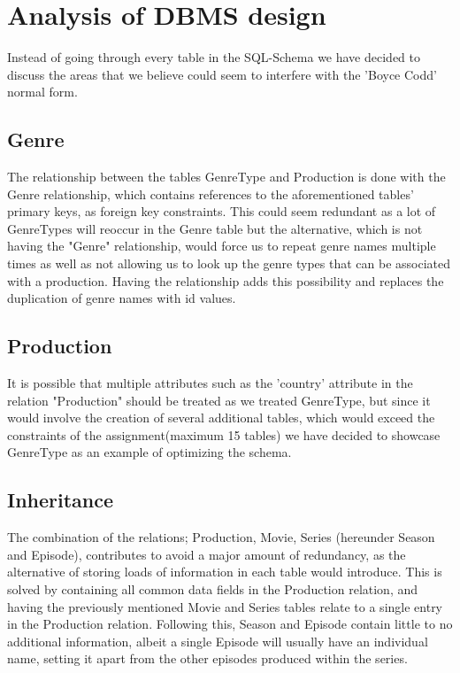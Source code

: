 \section{Analysis of DBMS design}

Instead of going through every table in the SQL-Schema we have decided to discuss the areas that we believe could seem to interfere with the 'Boyce Codd' normal form.\\ 

\subsection{Genre}
The relationship between the tables GenreType and Production is done with the Genre relationship, which contains references to the aforementioned tables' primary keys, as foreign key constraints. This could seem redundant as a lot of GenreTypes will reoccur in the Genre table but the alternative, which is not having the "Genre" relationship, would force us to repeat genre names multiple times as well as not allowing us to look up the genre types that can be associated with a production. Having the relationship adds this possibility and replaces the duplication of genre names with id values.\\

\subsection{Production}
It is possible that multiple attributes such as the 'country' attribute in the relation "Production" should be treated as we treated GenreType, but since it would involve the creation of several additional tables, which would exceed the constraints of the assignment(maximum 15 tables) we have decided to showcase GenreType as an example of optimizing the schema.\\

\subsection{Inheritance}
The combination of the relations; Production, Movie, Series (hereunder Season and Episode), contributes to avoid a major amount of redundancy, as the alternative of storing loads of information in each table would introduce. This is solved by containing all common data fields in the Production relation, and having the previously mentioned Movie and Series tables relate to a single entry in the Production relation. Following this, Season and Episode contain little to no additional information, albeit a single Episode will usually have an individual name, setting it apart from the other episodes produced within the series.

